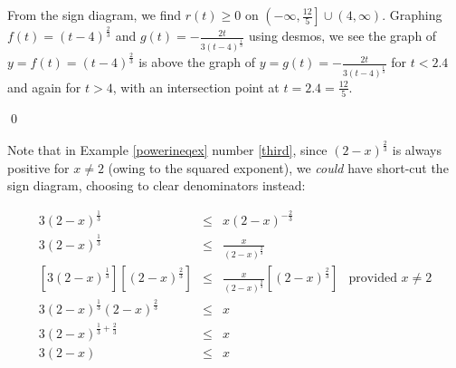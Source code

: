\documentclass{ximera}
\begin{document}
\begin{example}
\begin{enumerate}
\begin{image}
\end{image}

From the sign diagram, we find $r(t) \geq 0$ on $\left(-\infty, \frac{12}{5} \right] \cup (4, \infty)$.  Graphing $f(t) = (t-4)^{\frac{2}{3}}$  and $g(t) = -\frac{2t}{3(t-4)^{\frac{1}{3}}}$ using desmos, we see the graph of $y = f(t) = (t-4)^{\frac{2}{3}}$ is above the graph of $y =g(t) = -\frac{2t}{3(t-4)^{\frac{1}{3}}}$ for $t < 2.4$ and again for $t > 4$, with an intersection point at $t=2.4 = \frac{12}{5}$. 



\begin{center}
\end{center}





\end{enumerate}

\qed

\end{example}

\newpage

Note that in Example \ref{powerineqex} number \ref{third}, since $(2-x)^{\frac{2}{3}}$ is always positive  for $x \neq 2$ (owing to the squared exponent), we \textit{could} have short-cut the sign diagram, choosing to  clear denominators instead:

\[ \begin{array}{rclr}

3 (2-x)^{\frac{1}{3}} & \leq & x (2-x)^{-\frac{2}{3}} & \\

3 (2-x)^{\frac{1}{3}} & \leq & \frac{x}{(2-x)^{\frac{2}{3}}} & \\

\left[3 (2-x)^{\frac{1}{3}} \right] \left[  (2-x)^{\frac{2}{3}}\right]& \leq & \frac{x}{(2-x)^{\frac{2}{3}}}  \left[  (2-x)^{\frac{2}{3}}\right]&  \text{provided $x \neq 2$} \\
3 (2-x)^{\frac{1}{3}} (2-x)^{\frac{2}{3}} & \leq & x&  \\

3 (2-x)^{\frac{1}{3}+\frac{2}{3}} & \leq & x& \\

3(2-x) & \leq & x  & \\ \end{array} \]
\end{document}
